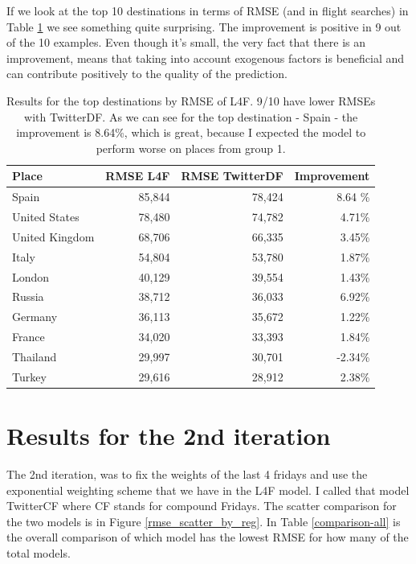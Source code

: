 \documentclass[minf,frontabs,twoside,singlespacing,parskip]{infthesis}
\begin{document}
If we look at the top 10 destinations in terms of RMSE (and in flight searches) in Table \ref{top10} we see something quite surprising.  The improvement is positive in 9 out of the 10 examples. Even though it's small, the very fact that there is an improvement, means that taking into account exogenous factors is beneficial and can contribute positively to the quality of the prediction.

\begin{table}[]
\begin{center}
\begin{tabular}{ l | r | r | r}
Place & RMSE L4F & RMSE TwitterDF & Improvement \\
\hline
Spain & 85,844 & 78,424 & 8.64 \% \\
United States & 78,480 & 74,782 & 4.71\% \\
United Kingdom & 68,706 & 66,335 & 3.45\% \\
Italy & 54,804 & 53,780 & 1.87\% \\
London & 40,129 & 39,554 & 1.43\% \\
Russia & 38,712 & 36,033 & 6.92\% \\
Germany & 36,113 & 35,672 & 1.22\% \\
France & 34,020 & 33,393 & 1.84\% \\
Thailand & 29,997 & 30,701 & -2.34\% \\
Turkey & 29,616 & 28,912 & 2.38\% 
\end{tabular}
\end{center}
\caption{Results for the top destinations by RMSE of L4F. 9/10 have lower RMSEs with TwitterDF. As we can see for the top destination - Spain - the improvement is 8.64\%, which is great, because I expected the model to perform worse on places from group 1.}
\label{top10}
\end{table}


\newpage
\section{Results for the 2nd iteration}

The 2nd iteration, was to fix the weights of the last 4 fridays and use the exponential weighting scheme that we have in the L4F model. I called that model TwitterCF where CF stands for compound Fridays. The scatter comparison for the two models is in Figure \ref{rmse_scatter_by_reg}. In Table \ref{comparison-all} is the overall comparison of which model has the lowest RMSE for how many of the total models. 
\end{document}
